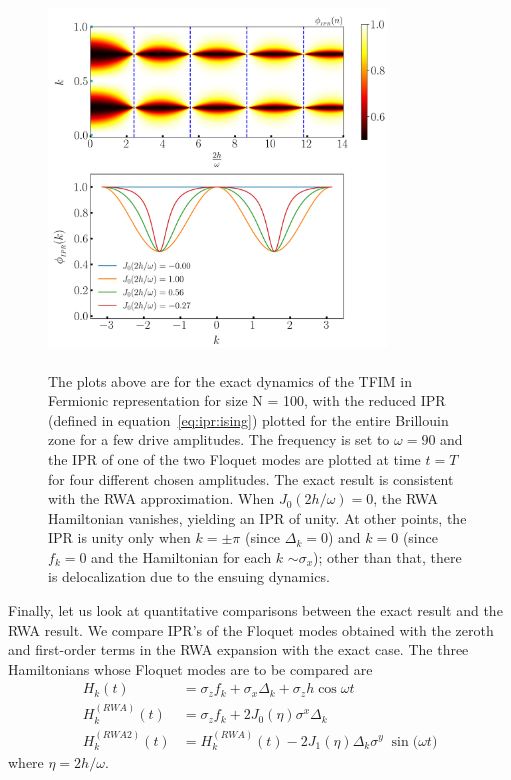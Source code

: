 \documentclass[%
 reprint,
 amsmath,amssymb,
 aps,
]{revtex4-2}
\begin{document}
\begin{figure}[]
	\centering
	\includegraphics[height = 10cm, width = 9.0cm]{ising_exact_ipr.jpeg}
	\caption{The plots above are for the exact dynamics of the TFIM in Fermionic representation for size N = 100, with the reduced IPR (defined in equation~\ref{eq:ipr:ising}) plotted for the entire Brillouin zone for a few drive amplitudes. The frequency is set to $\omega = 90$ and the IPR of one of the two Floquet modes are plotted at time $t=T$ for four different chosen amplitudes. The exact result is consistent with the RWA approximation. When $J_0(2h/\omega) = 0$, the RWA Hamiltonian vanishes, yielding an IPR of unity. At other points, the IPR is unity only when $k=\pm \pi$ (since $\Delta_k=0$) and $k=0$ (since $f_k = 0$ and the Hamiltonian for each $k$ $\sim \sigma_x$); other than that, there is delocalization due to the ensuing dynamics.}
\end{figure}

Finally, let us look at quantitative comparisons between the exact result and the RWA result.  We compare IPR's of the Floquet modes obtained with the zeroth and first-order terms in the RWA expansion with the exact case. The three Hamiltonians whose Floquet modes are to be compared are
\begin{align}
	H_k(t) &= \sigma_z f_k + \sigma_x \Delta_k + \sigma_z h\cos{\omega t}\\
	H^{(RWA)}_k(t) &= \sigma_z f_k + 2 J_0(\eta) \sigma^x \Delta_k\\
	H^{(RWA2)}_k(t) &= H^{(RWA)}_k(t) - 2 J_1(\eta)\Delta_k \sigma^y\;\sin{\big(\omega t\big)} 
\end{align}
where $\eta=2 h/\omega$. 
\end{document}

